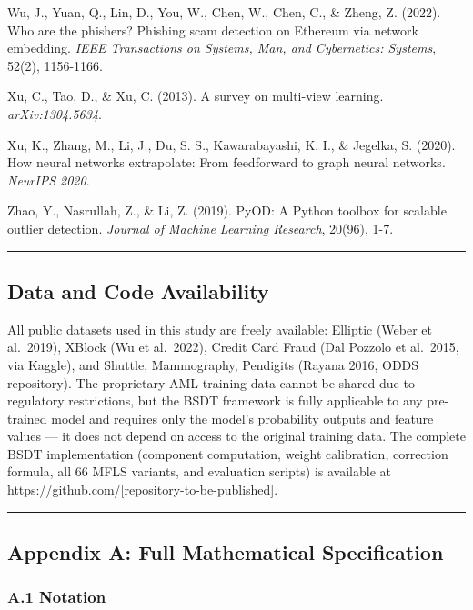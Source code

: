 \documentclass[
  11pt,
]{article}
\begin{document}
Wu, J., Yuan, Q., Lin, D., You, W., Chen, W., Chen, C., \& Zheng, Z.
(2022). Who are the phishers? Phishing scam detection on Ethereum via
network embedding. \emph{IEEE Transactions on Systems, Man, and
Cybernetics: Systems}, 52(2), 1156-1166.

Xu, C., Tao, D., \& Xu, C. (2013). A survey on multi-view learning.
\emph{arXiv:1304.5634}.

Xu, K., Zhang, M., Li, J., Du, S. S., Kawarabayashi, K. I., \& Jegelka,
S. (2020). How neural networks extrapolate: From feedforward to graph
neural networks. \emph{NeurIPS 2020}.

Zhao, Y., Nasrullah, Z., \& Li, Z. (2019). PyOD: A Python toolbox for
scalable outlier detection. \emph{Journal of Machine Learning Research},
20(96), 1-7.

\begin{center}\rule{0.5\linewidth}{0.5pt}\end{center}

\subsection{Data and Code
Availability}\label{data-and-code-availability}

All public datasets used in this study are freely available: Elliptic
(Weber et al.~2019), XBlock (Wu et al.~2022), Credit Card Fraud (Dal
Pozzolo et al.~2015, via Kaggle), and Shuttle, Mammography, Pendigits
(Rayana 2016, ODDS repository). The proprietary AML training data cannot
be shared due to regulatory restrictions, but the BSDT framework is
fully applicable to any pre-trained model and requires only the model’s
probability outputs and feature values — it does not depend on access to
the original training data. The complete BSDT implementation (component
computation, weight calibration, correction formula, all 66 MFLS
variants, and evaluation scripts) is available at
https://github.com/{[}repository-to-be-published{]}.

\begin{center}\rule{0.5\linewidth}{0.5pt}\end{center}

\subsection{Appendix A: Full Mathematical
Specification}\label{appendix-a-full-mathematical-specification}

\subsubsection{A.1 Notation}\label{a.1-notation}
\end{document}
